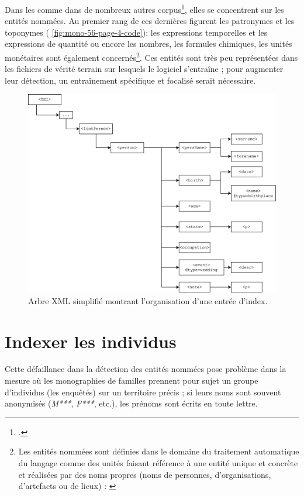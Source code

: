 Dans les \odm{} comme dans de nombreux autres corpus\footcite[p. 1]{sagot}, elles se concentrent sur les entités nommées. Au premier rang de ces dernières figurent les patronymes et les toponymes (\fig{} \ref{fig:mono-56-page-4-code}); les \og expressions temporelles et les expressions de quantité \fg{} ou encore \og les nombres, les formules chimiques, les unités monétaires \fg{} sont également concernés\footnote{Les entités nommées sont définies dans le domaine du traitement automatique du langage comme des \og unités faisant référence à une entité unique et concrète et réalisées par des noms propres (noms de personnes, d’organisations, d’artefacts ou de lieux) \fg{} : \cite[p. 4]{sagot}}. Ces entités sont très peu représentées dans les fichiers de vérité terrain sur lesquels le logiciel s'entraîne ; pour augmenter leur détection, un entraînement spécifique et focalisé serait nécessaire.

\begin{figure}[ht]
    \centering
    \includegraphics[width=16cm]{img/schema_index.png}
    \caption{Arbre XML simplifié montrant l'organisation d'une entrée d'index.}
    \label{fig:index_tree}
\end{figure}

\section{Indexer les individus}


Cette défaillance dans la détection des entités nommées pose problème dans la mesure où les monographies de familles prennent pour sujet un groupe d'individus (les enquêtés) sur un territoire précis ; si leurs noms sont souvent anonymisés (\textit{M***}, \textit{F***}, etc.), les prénoms sont écrits en toute lettre.

